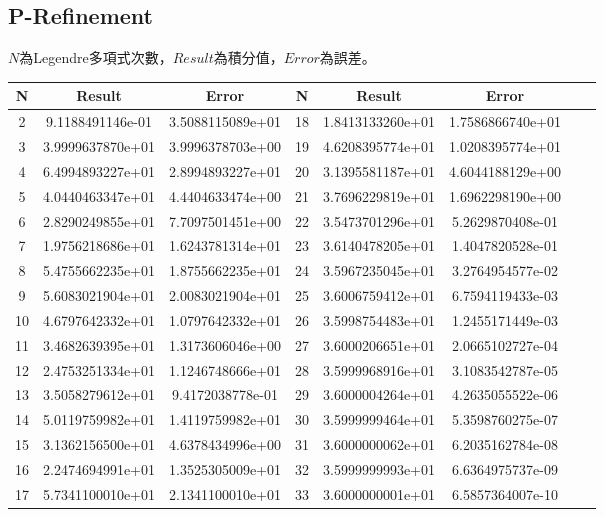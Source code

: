 \documentclass[a4paper,12pt]{article}
\begin{document}
\subsection{P-Refinement}
$N$為Legendre多項式次數，$Result$為積分值，$Error$為誤差。
\begin{longtable}{|c|c|c|c|c|c|c|c|}
    \hline
    N & Result & Error & N & Result & Error\\
    \hline
    2 & 9.1188491146e-01 & 3.5088115089e+01 & 18 & 1.8413133260e+01 & 1.7586866740e+01 \\
    \hline
    3 & 3.9999637870e+01 & 3.9996378703e+00 & 19 & 4.6208395774e+01 & 1.0208395774e+01 \\
    \hline
    4 & 6.4994893227e+01 & 2.8994893227e+01 & 20 & 3.1395581187e+01 & 4.6044188129e+00 \\
    \hline
    5 & 4.0440463347e+01 & 4.4404633474e+00 & 21 & 3.7696229819e+01 & 1.6962298190e+00 \\
    \hline
    6 & 2.8290249855e+01 & 7.7097501451e+00 & 22 & 3.5473701296e+01 & 5.2629870408e-01 \\
    \hline
    7 & 1.9756218686e+01 & 1.6243781314e+01 & 23 & 3.6140478205e+01 & 1.4047820528e-01 \\
    \hline
    8 & 5.4755662235e+01 & 1.8755662235e+01 & 24 & 3.5967235045e+01 & 3.2764954577e-02 \\
    \hline
    9 & 5.6083021904e+01 & 2.0083021904e+01 & 25 & 3.6006759412e+01 & 6.7594119433e-03 \\
    \hline
    10 & 4.6797642332e+01 & 1.0797642332e+01 & 26 & 3.5998754483e+01 & 1.2455171449e-03 \\
    \hline
    11 & 3.4682639395e+01 & 1.3173606046e+00 & 27 & 3.6000206651e+01 & 2.0665102727e-04 \\
    \hline
    12 & 2.4753251334e+01 & 1.1246748666e+01 & 28 & 3.5999968916e+01 & 3.1083542787e-05 \\
    \hline
    13 & 3.5058279612e+01 & 9.4172038778e-01 & 29 & 3.6000004264e+01 & 4.2635055522e-06 \\
    \hline
    14 & 5.0119759982e+01 & 1.4119759982e+01 & 30 & 3.5999999464e+01 & 5.3598760275e-07 \\
    \hline
    15 & 3.1362156500e+01 & 4.6378434996e+00 & 31 & 3.6000000062e+01 & 6.2035162784e-08 \\
    \hline
    16 & 2.2474694991e+01 & 1.3525305009e+01 & 32 & 3.5999999993e+01 & 6.6364975737e-09 \\
    \hline
    17 & 5.7341100010e+01 & 2.1341100010e+01 & 33 & 3.6000000001e+01 & 6.5857364007e-10 \\
    \hline    
\end{longtable}
\end{document}
